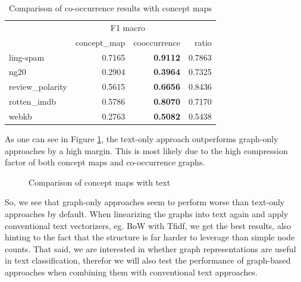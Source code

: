 \begin{table}[htb!]
	\centering
	\begin{tabular}{lrrr}
		{} &  \multicolumn{2}{c}{F1 macro} &  {} \\
		&  concept\_map &  cooccurrence &   ratio \\
		\midrule
		ling-spam       &  0.7165 &  \textbf{0.9112} &  0.7863 \\
		ng20            &  0.2904 &  \textbf{0.3964} &  0.7325 \\
		review\_polarity &  0.5615 &  \textbf{0.6656} &  0.8436 \\
		rotten\_imdb     &  0.5786 &  \textbf{0.8070} &  0.7170 \\
		webkb           &  0.2763 &  \textbf{0.5082} &  0.5438 \\
		\bottomrule
	\end{tabular}
	\caption[Results: Co-Occurrence vs. Concept Maps]{Comparison of co-occurrence results with concept maps}\label{table:comparison_results_cooccurrence}
\end{table}

\todo{!}

As one can see in Figure \ref{fig:results_cmap_vs_text}, the text-only approach outperforms graph-only approaches by a high margin.
This is most likely due to the high compression factor of both concept maps and co-occurrence graphs.

\begin{figure}[htb!]
	\centering
	\missingfigure[figcolor=white]{}
	\caption[Results: Concept Maps vs. Text]{Comparison of concept maps with text}
	\label{fig:results_cmap_vs_text}
\end{figure}

So, we see that graph-only approaches seem to perform worse than text-only approaches by default.
When linearizing the graphs into text again and apply conventional text vectorizers, eg. BoW with Tfidf, we get the best results, also hinting to the fact that the structure is far harder to leverage than simple node counts.
That said, we are interested in whether graph representations are useful in text classification, therefor we will also test the performance of graph-based approaches when combining them with conventional text approaches.



